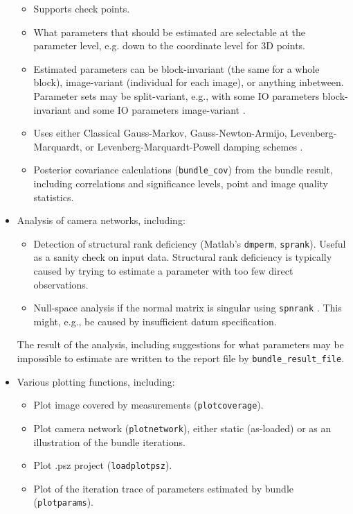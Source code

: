 \documentclass{article}
\begin{document}
\begin{itemize}
\begin{itemize}
\item Supports check points.
\item What parameters that should be estimated are selectable at the
parameter level, e.g. down to the coordinate level for 3D points.
\item Estimated parameters can be block-invariant (the same for a whole
block), image-variant (individual for each image), or anything
inbetween. Parameter sets may be split-variant, e.g., with some IO
parameters block-invariant and some IO parameters image-variant
\citep{Borlin2019:Flexible}.
\item \sloppy Uses either Classical Gauss-Markov, Gauss-Newton-Armijo,
Levenberg-Marquardt, or Levenberg-Marquardt-Powell damping schemes
\citep{Borlin2013:Bundle,Borlin2014:Camera,Borlin2016:External}.
\item Posterior covariance calculations (\texttt{bundle\_cov}) from the bundle
result, including correlations and significance levels, point and
image quality statistics\citep{Borlin2020:Efficient}.
\end{itemize}
\item Analysis of camera networks, including:
\begin{itemize}
\item Detection of structural rank deficiency (Matlab's \texttt{dmperm},
\texttt{sprank}). Useful as a sanity check on input data. Structural rank
deficiency is typically caused by trying to estimate a parameter
with too few direct observations.
\item Null-space analysis if the normal matrix is singular using
\texttt{spnrank} \citep{Foster2009:Calculating}. This might, e.g., be
caused by insufficient datum specification.
\end{itemize}
\sloppy The result of the analysis, including suggestions for what
parameters may be impossible to estimate are written to the report
file by \texttt{bundle\_result\_file}.
\item Various plotting functions, including:
\begin{itemize}
\item Plot image covered by measurements (\texttt{plotcoverage}).
\item Plot camera network (\texttt{plotnetwork}), either static (as-loaded) or
as an illustration of the bundle iterations.
\item Plot .psz project (\texttt{loadplotpsz}).
\item Plot of the iteration trace of parameters estimated by bundle
(\texttt{plotparams}).

\end{itemize}
\end{itemize}
\end{document}
